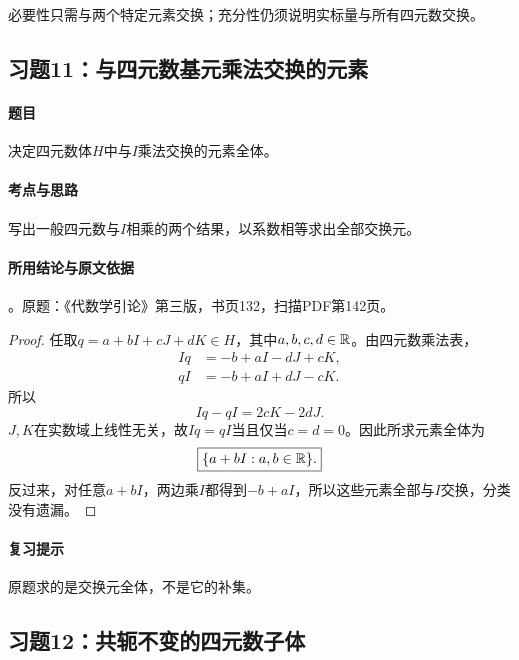 必要性只需与两个特定元素交换；充分性仍须说明实标量与所有四元数交换。



\subsection{习题11：与四元数基元乘法交换的元素}

\label{ex:3:11}

\paragraph{题目}

决定四元数体$H$中与$I$乘法交换的元素全体。

\paragraph{考点与思路}

写出一般四元数与$I$相乘的两个结果，以系数相等求出全部交换元。

\paragraph{所用结论与原文依据}

。原题：《代数学引论》第三版，书页132，扫描PDF第142页。


\begin{proof}

任取$q=a+bI+cJ+dK\in H$，其中$a,b,c,d\in\mathbb R$。由四元数乘法表，
\begin{align*}
Iq&=-b+aI-dJ+cK,\\
qI&=-b+aI+dJ-cK.
\end{align*}
所以
\[
Iq-qI=2cK-2dJ.
\]
$J,K$在实数域上线性无关，故$I q=q I$当且仅当$c=d=0$。因此所求元素全体为
\[
\boxed{\{a+bI:a,b\in\mathbb R\}.}
\]
反过来，对任意$a+bI$，两边乘$I$都得到$-b+aI$，所以这些元素全部与$I$交换，分类没有遗漏。

\end{proof}

\paragraph{复习提示}

原题求的是交换元全体，不是它的补集。



\subsection{习题12：共轭不变的四元数子体}

